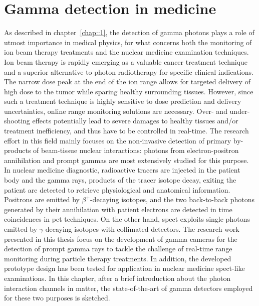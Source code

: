 \chapter{Gamma detection in medicine}\label{chap::2}

\vfill

\minitoc

\newpage

\glsresetall

As described in chapter~\ref{chap::1}, the detection of gamma photons plays a role of utmost importance in medical physics, for what concerns both the monitoring of ion beam therapy treatments and the nuclear medicine examination techniques. 
Ion beam therapy is rapidly emerging as a valuable cancer treatment technique and a superior alternative to photon radiotherapy for specific clinical indications. The narrow dose peak at the end of the ion range allows for targeted delivery of high dose to the tumor while sparing healthy surrounding tissues. However, since such a treatment technique is highly sensitive to dose prediction and delivery uncertainties, online range monitoring solutions are necessary. Over- and under-shooting effects potentially lead to severe damages to healthy tissues and/or treatment inefficiency, and thus have to be controlled in real-time. The research effort in this field mainly focuses on the non-invasive detection of primary by-products of beam-tissue nuclear interactions: photons from electron-positron annihilation and prompt gammas are most extensively studied for this purpose. 
In nuclear medicine diagnostic, radioactive tracers are injected in the patient body and the gamma rays, products of the tracer isotope decay, exiting the patient are detected to retrieve physiological and anatomical information. Positrons are emitted by $\beta^+$-decaying isotopes, and the two back-to-back photons generated by their annihilation with patient electrons are detected in time coincidences in \gls{pet} techniques. On the other hand, \gls{spect} exploits single photons emitted by $\gamma$-decaying isotopes with collimated detectors.
The research work presented in this thesis focus on the development of gamma cameras for the detection of prompt gamma rays to tackle the challenge of real-time range monitoring during particle therapy treatments. In addition, the developed prototype design has been tested for application in nuclear medicine \gls{spect}-like examinations. 
In this chapter, after a brief introduction about the photon interaction channels in matter, the state-of-the-art of gamma detectors employed for these two purposes is sketched.

